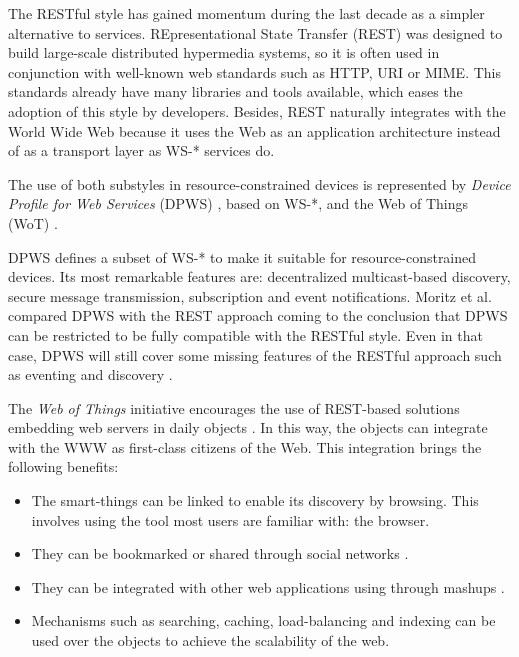 The RESTful style has gained momentum during the last decade as a simpler alternative to services.
REpresentational State Transfer (REST) was designed to build large-scale distributed hypermedia systems,
so it is often used in conjunction with well-known web standards such as HTTP, URI or MIME.
This standards already have many libraries and tools available, which eases the adoption of this style by developers.
Besides, REST naturally integrates with the World Wide Web because it uses the Web as an application architecture instead of as a transport layer as WS-* services do.


\medskip


The use of both substyles in resource-constrained devices is represented by
\textit{Device Profile for Web Services} (DPWS) \cite{moritz_devices_2010}, based on WS-*,
and the Web of Things (WoT) \cite{guinard_internet_2011}. %


DPWS defines a subset of WS-* to make it suitable for resource-constrained devices.
Its most remarkable features are: decentralized multicast-based discovery, secure message transmission, subscription and event notifications.
Moritz et al. compared DPWS with the REST approach coming to the conclusion that DPWS can be restricted to be fully compatible with the RESTful style.
Even in that case, DPWS will still cover some missing features of the RESTful approach such as eventing and discovery \cite{moritz_devices_2010}.


The \emph{Web of Things} initiative encourages the use of REST-based solutions embedding web servers in daily objects \cite{guinard_internet_2011}.
In this way, the objects can integrate with the WWW as first-class citizens of the Web.
This integration brings the following benefits:
\begin{itemize}
  \item The smart-things can be linked to enable its discovery by browsing. This involves using the tool most users are familiar with: the browser.
  \item They can be bookmarked or shared through social networks \cite{guinard_sharing_2010}.
  \item They can be integrated with other web applications using through mashups \cite{ostermaier_webplug:_2010}. %
  \item Mechanisms such as searching, caching, load-balancing and indexing can be used over the objects to achieve the scalability of the web. %
\end{itemize}



